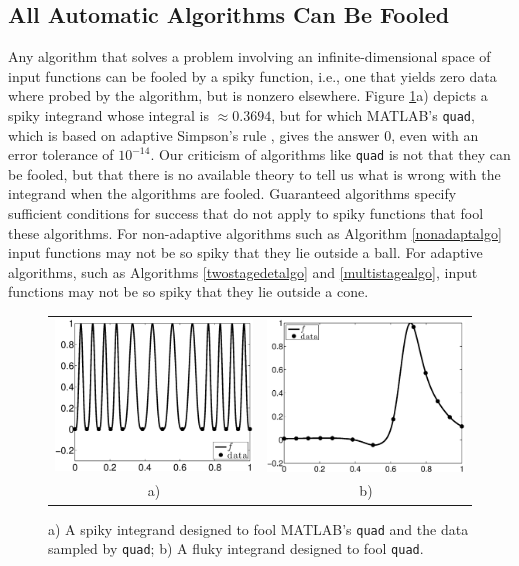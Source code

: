 \documentclass[]{elsarticle}
\theoremstyle{definition}
\theoremstyle{remark}
\begin{document}
\subsection{All Automatic Algorithms Can Be Fooled}  

Any algorithm that solves a problem involving an infinite-dimensional space of input functions can be fooled by a spiky function, i.e., one that yields zero data where probed by the algorithm, but is nonzero elsewhere.   Figure \ref{fig:foolquad}a) depicts a spiky integrand whose integral is $\approx 0.3694$, but for which MATLAB's {\tt quad}, which is based on adaptive Simpson's rule  \cite{GanGau00a}, gives the answer $0$, even with an error tolerance of $10^{-14}$.  Our criticism of algorithms like {\tt quad} is not that they can be fooled, but that there is no available theory to tell us what is wrong with the integrand when the algorithms are fooled.  Guaranteed algorithms specify sufficient conditions for success that do not apply to spiky functions that fool these algorithms.  For non-adaptive algorithms such as Algorithm \ref{nonadaptalgo} input functions may not be so spiky that they lie outside a ball.  For adaptive algorithms, such as  Algorithms \ref{twostagedetalgo} and \ref{multistagealgo}, input functions may not be so spiky that they lie outside a cone.

\begin{figure}
\centering 
\begin{tabular}{cc}
\includegraphics[width=5.5cm]{Foolquadbw.eps}
&
\includegraphics[width=5.5cm]{foolbwquadexample.eps} \\
a) & b)
\end{tabular}
\caption{a) A spiky integrand designed to fool MATLAB's {\tt quad} and the data sampled by {\tt quad}; b) A fluky integrand designed to fool {\tt quad}. \label{fig:foolquad}}
\end{figure}
\end{document}
